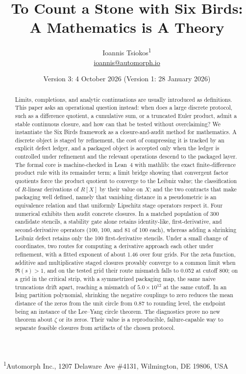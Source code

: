 \documentclass[11pt]{article}
\title{To Count a Stone with Six Birds: A Mathematics is A Theory}
\author{Ioannis Tsiokos\textsuperscript{1}\\[2pt]
  \small\href{mailto:ioannis@automorph.io}{ioannis@automorph.io}}
\date{Version 3: 4 October 2026 \quad (Version 1: 28 January 2026)}
\newcommand{\printaffiliation}{%
  \begin{center}
    \small \textsuperscript{1}Automorph Inc., 1207 Delaware Ave \#4131, Wilmington, DE 19806, USA
  \end{center}
}
\begin{document}
\maketitle
\printaffiliation
\thispagestyle{firstpage}



\begin{abstract}
Limits, completions, and analytic continuations are usually introduced as definitions. This paper asks an operational question instead: when does a large discrete protocol, such as a difference quotient, a cumulative sum, or a truncated Euler product, admit a stable continuous closure, and how can that be tested without overclaiming? We instantiate the Six Birds framework as a closure-and-audit method for mathematics. A discrete object is staged by refinement, the cost of compressing it is tracked by an explicit defect ledger, and a packaged object is accepted only when the ledger is controlled under refinement and the relevant operations descend to the packaged layer. The formal core is machine-checked in Lean~4 with mathlib: the exact finite-difference product rule with its remainder term; a limit bridge showing that convergent factor quotients force the product quotient to converge to the Leibniz value; the classification of $R$-linear derivations of $R[X]$ by their value on $X$; and the two contracts that make packaging well defined, namely that vanishing distance in a pseudometric is an equivalence relation and that uniformly Lipschitz stage operators respect it. Four numerical exhibits then audit concrete closures. In a matched population of 300 candidate stencils, a stability gate alone retains identity-like, first-derivative, and second-derivative operators (100, 100, and 81 of 100 each), whereas adding a shrinking Leibniz defect retains only the 100 first-derivative stencils. Under a small change of coordinates, two routes for computing a derivative approach each other under refinement, with a fitted exponent of about 1.46 over four grids. For the zeta function, additive and multiplicative staged closures provably converge to a common limit when $\Re(s)>1$, and on the tested grid their route mismatch falls to 0.052 at cutoff 800; on a grid in the critical strip, with a symmetrized packaging map, the same naive truncations drift apart, reaching a mismatch of $5.0\times 10^{12}$ at the same cutoff. In an Ising partition polynomial, shrinking the negative couplings to zero reduces the mean distance of the zeros from the unit circle from 0.87 to rounding level, the endpoint being an instance of the Lee--Yang circle theorem. The diagnostics prove no new theorem about $\zeta$ or its zeros. Their value is a reproducible, failure-capable way to separate feasible closures from artifacts of the chosen protocol.
\end{abstract}
\end{document}
